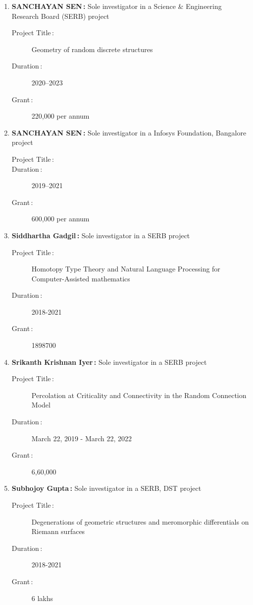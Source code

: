 \begin{enumerate}
\item {\bf SANCHAYAN SEN\,:} Sole investigator in a Science \& Engineering Research Board (SERB) project
\begin{description}
  \item[Project Title\,:] Geometry of random discrete structures
  \item[Duration\,:] 2020--2023
  \item[Grant\,:] 220,000 per annum
\end{description}


\item {\bf SANCHAYAN SEN\,:} Sole investigator in a Infosys Foundation, Bangalore project
\begin{description}
  \item[Project Title\,:] 
  \item[Duration\,:] 2019--2021
  \item[Grant\,:] 600,000 per annum
\end{description}


\item {\bf Siddhartha Gadgil\,:} Sole investigator in a SERB project
\begin{description}
  \item[Project Title\,:] Homotopy Type Theory and Natural Language Processing for Computer-Assisted mathematics
  \item[Duration\,:] 2018-2021
  \item[Grant\,:] 1898700
\end{description}


\item {\bf Srikanth Krishnan Iyer\,:} Sole investigator in a SERB project
\begin{description}
  \item[Project Title\,:] Percolation at Criticality and Connectivity in the Random Connection Model
  \item[Duration\,:] March 22, 2019 - March 22, 2022
  \item[Grant\,:] 6,60,000
\end{description}


\item {\bf Subhojoy Gupta\,:} Sole investigator in a SERB, DST project
\begin{description}
  \item[Project Title\,:] Degenerations of geometric structures and meromorphic differentials on Riemann surfaces
  \item[Duration\,:] 2018-2021
  \item[Grant\,:] 6 lakhs
\end{description}



\end{enumerate}
